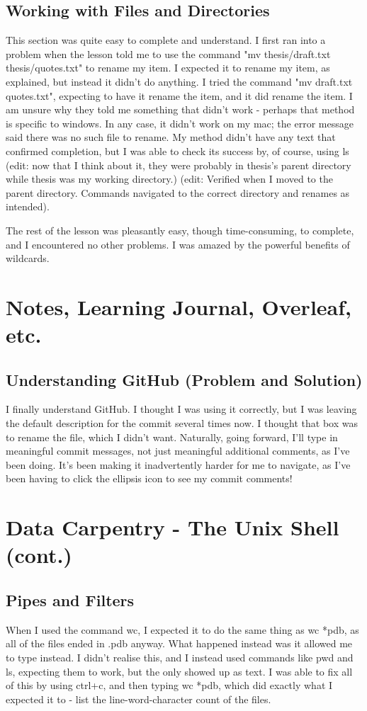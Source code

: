 \documentclass{article}
\begin{document}
\subsection{Working with Files and Directories}
This section was quite easy to complete and understand. I first ran into a problem when the lesson told me to use the command "mv thesis/draft.txt thesis/quotes.txt" to rename my item. I expected it to rename my item, as explained, but instead it didn't do anything. I tried the command "mv draft.txt quotes.txt", expecting to have it rename the item, and it did rename the item. I am unsure why they told me something that didn't work - perhaps that method is specific to windows. In any case, it didn't work on my mac; the error message said there was no such file to rename. My method didn't have any text that confirmed completion, but I was able to check its success by, of course, using ls (edit: now that I think about it, they were probably in thesis's parent directory while thesis was my working directory.) (edit: Verified when I moved to the parent directory. Commands navigated to the correct directory and renames as intended).

The rest of the lesson was pleasantly easy, though time-consuming, to complete, and I encountered no other problems. I was amazed by the powerful benefits of wildcards.

\section{Notes, Learning Journal, Overleaf, etc.}
\subsection{Understanding GitHub (Problem and Solution)}
I finally understand GitHub. I thought I was using it correctly, but I was leaving the default description for the commit several times now. I thought that box was to rename the file, which I didn't want. Naturally, going forward, I'll type in meaningful commit messages, not just meaningful additional comments, as I've been doing. It's been making it inadvertently harder for me to navigate, as I've been having to click the ellipsis icon to see my commit comments!
\newpage
\date{29th August - 6th September 2019}
\section{Data Carpentry - The Unix Shell (cont.)}
\subsection{Pipes and Filters}
When I used the command wc, I expected it to do the same thing as wc *pdb, as all of the files ended in .pdb anyway. What happened instead was it allowed me to type instead. I didn't realise this, and I instead used commands like pwd and ls, expecting them to work, but the only showed up as text. I was able to fix all of this by using ctrl+c, and then typing wc *pdb, which did exactly what I expected it to - list the line-word-character count of the files.
\end{document}
